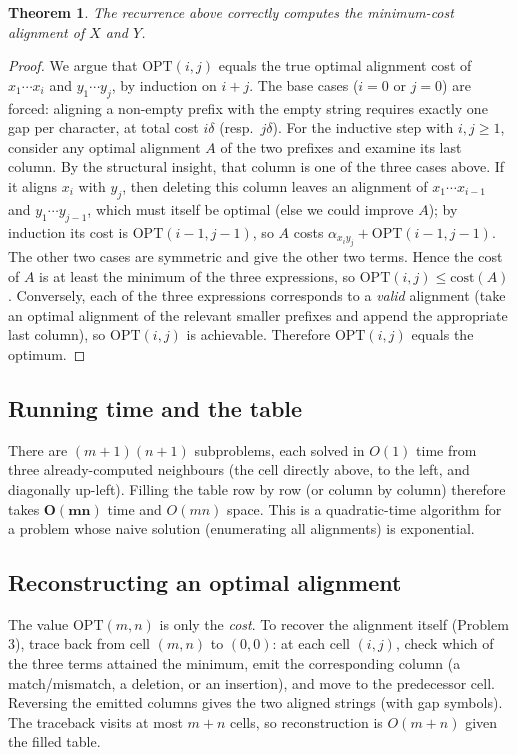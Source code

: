 \documentclass[11pt]{article}
\newtheorem{theorem}{Theorem}[section]
\begin{document}
\begin{theorem}
\label{thm:align}
The recurrence above correctly computes the minimum-cost alignment of $X$ and $Y$.
\end{theorem}

\begin{proof}
We argue that $\mathrm{OPT}(i,j)$ equals the true optimal alignment cost of $x_1\cdots x_i$
and $y_1\cdots y_j$, by induction on $i+j$. The base cases ($i=0$ or $j=0$) are forced:
aligning a non-empty prefix with the empty string requires exactly one gap per character,
at total cost $i\delta$ (resp.\ $j\delta$). For the inductive step with $i,j \ge 1$,
consider any optimal alignment $A$ of the two prefixes and examine its last column. By the
structural insight, that column is one of the three cases above. If it aligns $x_i$ with
$y_j$, then deleting this column leaves an alignment of $x_1\cdots x_{i-1}$ and
$y_1\cdots y_{j-1}$, which must itself be optimal (else we could improve $A$); by induction
its cost is $\mathrm{OPT}(i-1,j-1)$, so $A$ costs $\alpha_{x_i y_j} + \mathrm{OPT}(i-1,j-1)$.
The other two cases are symmetric and give the other two terms. Hence the cost of $A$ is at
least the minimum of the three expressions, so $\mathrm{OPT}(i,j) \le \mathrm{cost}(A)$.
Conversely, each of the three expressions corresponds to a \emph{valid} alignment (take an
optimal alignment of the relevant smaller prefixes and append the appropriate last column),
so $\mathrm{OPT}(i,j)$ is achievable. Therefore $\mathrm{OPT}(i,j)$ equals the optimum.
\end{proof}

\subsection{Running time and the table}

There are $(m+1)(n+1)$ subproblems, each solved in $O(1)$ time from three already-computed
neighbours (the cell directly above, to the left, and diagonally up-left). Filling the
table row by row (or column by column) therefore takes $\mathbf{O(mn)}$ time and
$O(mn)$ space. This is a quadratic-time algorithm for a problem whose naive solution
(enumerating all alignments) is exponential.

\subsection{Reconstructing an optimal alignment}

The value $\mathrm{OPT}(m,n)$ is only the \emph{cost}. To recover the alignment itself
(Problem 3), trace back from cell $(m,n)$ to $(0,0)$: at each cell $(i,j)$, check which of
the three terms attained the minimum, emit the corresponding column (a match/mismatch, a
deletion, or an insertion), and move to the predecessor cell. Reversing the emitted columns
gives the two aligned strings (with gap symbols). The traceback visits at most $m+n$ cells,
so reconstruction is $O(m+n)$ given the filled table.
\end{document}
